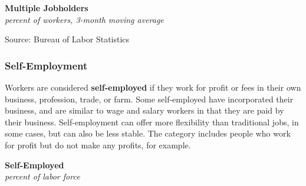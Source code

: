 \documentclass{report}
\makeatletter
\newcommand{\tbllink}[1]{\href{https://raw.githubusercontent.com/bdecon/US-chartbook/master/chartbook/data/#1}{\faTable}}
\newcommand*\short[1]{\expandafter\@gobbletwo\number\numexpr#1\relax}
\newcommand{\shdateaxisticks}{
		date coordinates in=x, axis line style={draw=none},
		xmax={2023-11-01},
		max space between ticks=40,	    
		xtick={{1990-01-01}, {1995-01-01}, {2000-01-01}, 
			{2005-01-01}, {2010-01-01}, {2015-01-01}, {2020-01-01}},
		minor xtick={},
		enlarge y limits={0.06}, enlarge x limits={0.01},
		}
\newcommand{\stdline}[4]{\addplot[very thick, no markers, color=#1] 
		table [x=#2, y=#3, col sep=comma] {#4};	}
\newcommand{\rebars}{
		\fill[color=black!10] (axis cs:{2007-12-01},\pgfkeysvalueof{/pgfplots/ymin}) rectangle 
			(axis cs:{2009-07-01}, \pgfkeysvalueof{/pgfplots/ymax});
		\fill[color=black!10] (axis cs:{2001-03-01},\pgfkeysvalueof{/pgfplots/ymin}) rectangle 
			(axis cs:{2001-11-01}, \pgfkeysvalueof{/pgfplots/ymax});
		\fill[color=black!10] (axis cs:{2020-02-01},\pgfkeysvalueof{/pgfplots/ymin}) rectangle 
			(axis cs:{2020-05-01}, \pgfkeysvalueof{/pgfplots/ymax});}
\makeatother
\begin{document}
{\begin{minipage}{0.42\textwidth}
\normalsize \textbf{Multiple Jobholders}\\
\footnotesize{\textit{percent of workers, 3-month moving average}}
\vspace{2.8cm}

\hspace{2mm} 

\footnotesize{Source: Bureau of Labor Statistics} \hfill \tbllink{mjh.csv} \ \
\end{minipage} \hspace{5mm}
\begin{minipage}{0.3\textwidth}
\small 
\end{minipage}
\newpage
\begin{minipage}{0.76\textwidth}
\subsubsection*{Self-Employment}
\small Workers are considered \textbf{self-employed} if they work for profit or fees in their own business, profession, trade, or farm. Some self-employed have incorporated their business, and are similar to wage and salary workers in that they are paid by their business. Self-employment can offer more flexibility than traditional jobs, in some cases, but can also be less stable. The category includes people who work for profit but do not make any profits, for example. 


\end{minipage}

\begin{minipage}{0.475\textwidth}
\normalsize \textbf{Self-Employed}\\
\footnotesize{\textit{percent of labor force}}
\vspace{3.6cm}


\end{minipage}}
\end{document}
